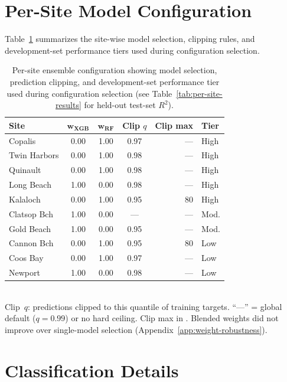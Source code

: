 \documentclass[toxins,article,submit,moreauthors]{Definitions/mdpi}
\begin{document}
\section{Per-Site Model Configuration}
\label{app:model-config}

Table~\ref{tab:ensemble-config} summarizes the site-wise model selection, clipping rules, and development-set performance tiers used during configuration selection.

\begin{table}[H]
\caption{Per-site ensemble configuration showing model selection, prediction clipping, and development-set performance tier used during configuration selection (see Table~\ref{tab:per-site-results} for held-out test-set $R^2$).}
\label{tab:ensemble-config}
\centering\footnotesize
\begin{tabular*}{\linewidth}{@{\extracolsep{\fill}}lcccrl}
\toprule
\textbf{Site} & $\boldsymbol{w_{\text{XGB}}}$ & $\boldsymbol{w_{\text{RF}}}$ & \textbf{Clip $q$} & \textbf{Clip max} & \textbf{Tier} \\
\midrule
Copalis       & 0.00 & 1.00 & 0.97 & --- & High \\
Twin Harbors  & 0.00 & 1.00 & 0.98 & --- & High \\
Quinault      & 0.00 & 1.00 & 0.98 & --- & High \\
Long Beach    & 1.00 & 0.00 & 0.98 & --- & High \\
Kalaloch      & 0.00 & 1.00 & 0.95 & 80  & High \\
\addlinespace
Clatsop Bch   & 1.00 & 0.00 & --- & --- & Mod. \\
Gold Beach    & 1.00 & 0.00 & 0.95 & --- & Mod. \\
\addlinespace
Cannon Bch    & 0.00 & 1.00 & 0.95 & 80  & Low \\
Coos Bay      & 0.00 & 1.00 & 0.97 & --- & Low \\
Newport       & 1.00 & 0.00 & 0.98 & --- & Low \\
\bottomrule
\end{tabular*}
\vspace{0.3em}\\
\footnotesize{Clip~$q$: predictions clipped to this quantile of training targets. ``---'' = global default ($q = 0.99$) or no hard ceiling. Clip max in \si{\microgrampeg}. Blended weights did not improve over single-model selection (Appendix~\ref{app:weight-robustness}).}
\end{table}

\section{Classification Details}
\label{app:classification-details}
\end{document}
